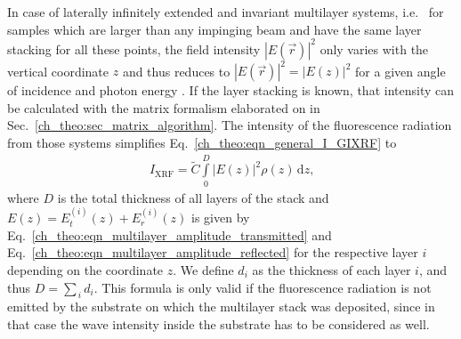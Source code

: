 In case of laterally infinitely extended and invariant multilayer systems, i.e.~ for samples which are larger than any impinging beam and have the same layer stacking for all these points, the field intensity $|E(\vec{r})|^2$ only varies with the vertical coordinate $z$ and thus reduces to $|E(\vec{r})|^2 = |E(z)|^2$ for a given angle of incidence and photon energy \cite{de_boer_glancing-incidence_1991}. If the layer stacking is known, that intensity can be calculated with the matrix formalism elaborated on in Sec.~\ref{ch_theo:sec_matrix_algorithm}. The intensity of the fluorescence radiation from those systems simplifies Eq.~\eqref{ch_theo:eqn_general_I_GIXRF} to 
\begin{align}
 I_\text{XRF} = \tilde{C} \int\limits_0^{D} |E(z)|^2 \rho(z) 
\,\text{d}z \text{,} \label{ch_theo:eqn_I_GIXRF_multilayer}
\end{align}
where $D$ is the total thickness of all layers of the stack and $E(z) = E^{(i)}_t(z) + E^{(i)}_r(z)$ is given by Eq.~\eqref{ch_theo:eqn_multilayer_amplitude_transmitted} and Eq.~\eqref{ch_theo:eqn_multilayer_amplitude_reflected} for the respective layer $i$ depending on the coordinate $z$. We define $d_i$ as the thickness of each layer $i$, and thus $D = \sum_{\,i} d_i$. This formula is only valid if the fluorescence radiation is not emitted by the substrate on which the multilayer stack was deposited, since in that case the wave intensity inside the substrate has to be considered as well.

